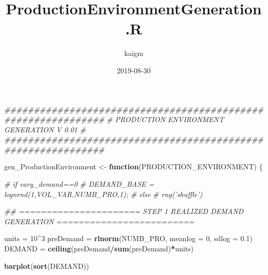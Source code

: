 \documentclass[]{article}
\title{ProductionEnvironmentGeneration.R}
\author{kaigm}
\date{2019-08-30}
\newenvironment{Shaded}{\begin{snugshade}}{\end{snugshade}}
\newcommand{\CommentTok}[1]{\textcolor[rgb]{0.56,0.35,0.01}{\textit{#1}}}
\newcommand{\ControlFlowTok}[1]{\textcolor[rgb]{0.13,0.29,0.53}{\textbf{#1}}}
\newcommand{\DataTypeTok}[1]{\textcolor[rgb]{0.13,0.29,0.53}{#1}}
\newcommand{\DecValTok}[1]{\textcolor[rgb]{0.00,0.00,0.81}{#1}}
\newcommand{\FloatTok}[1]{\textcolor[rgb]{0.00,0.00,0.81}{#1}}
\newcommand{\KeywordTok}[1]{\textcolor[rgb]{0.13,0.29,0.53}{\textbf{#1}}}
\newcommand{\NormalTok}[1]{#1}
\newcommand{\OperatorTok}[1]{\textcolor[rgb]{0.81,0.36,0.00}{\textbf{#1}}}
\newcommand{\StringTok}[1]{\textcolor[rgb]{0.31,0.60,0.02}{#1}}
\begin{document}
\maketitle

\begin{Shaded}
\begin{Highlighting}[]
\CommentTok{#############################################################}
\CommentTok{# PRODUCTION ENVIRONMENT GENERATION V 0.01}
\CommentTok{# }
\CommentTok{#############################################################}

\NormalTok{gen_ProductionEnvironment <-}\StringTok{ }\ControlFlowTok{function}\NormalTok{(PRODUCTION_ENVIRONMENT) \{}

  \CommentTok{#  if vary_demand==0 }
 \CommentTok{#  DEMAND_BASE = lognrnd(1,VOL_VAR,NUMB_PRO,1);}
 \CommentTok{#  else}
 \CommentTok{#  rng('shuffle') }


\CommentTok{## ====================== STEP 1 REALIZED DEMAND GENERATION ========================= }

\NormalTok{units =}\StringTok{ }\DecValTok{10}\OperatorTok{^}\DecValTok{3}
\NormalTok{preDemand =}\StringTok{ }\KeywordTok{rlnorm}\NormalTok{(NUMB_PRO, }\DataTypeTok{meanlog =} \DecValTok{0}\NormalTok{, }\DataTypeTok{sdlog =} \FloatTok{0.1}\NormalTok{)}
\NormalTok{DEMAND =}\StringTok{ }\KeywordTok{ceiling}\NormalTok{(preDemand}\OperatorTok{/}\KeywordTok{sum}\NormalTok{(preDemand)}\OperatorTok{*}\NormalTok{units)}

\KeywordTok{barplot}\NormalTok{(}\KeywordTok{sort}\NormalTok{(DEMAND))}



\end{Highlighting}
\end{Shaded}
\end{document}
